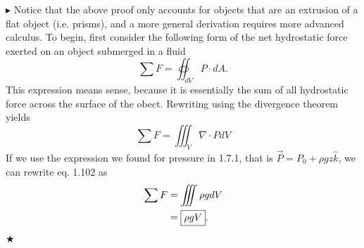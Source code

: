 \noindent\color{Orchid}$\blacktriangleright$ \color{black} Notice that the above proof only accounts for objects that are an extrusion of a flat object (i.e. prisms), and a more general derivation requires more advanced calculus. To begin, first consider the following form of the net hydrostatic force exerted on an object submerged in a fluid
\begin{equation}
    \sum F = \oiint_{dV}P \cdot dA.
\end{equation}
\noindent This expression means sense, because it is essentially the sum of all hydrostatic force across the surface of the obect. Rewriting using the divergence theorem yields
\begin{equation}
    \sum F = \iiint_{V} \nabla \cdot PdV
\end{equation}
\noindent If we use the expression we found for pressure in 1.7.1, that is $\vec{P} = P_0 + \rho g z \hat{k}$, we can rewrite eq. 1.102 as
\begin{align}
    \sum F &= \iiint  \rho g dV \nonumber \\
    &= \boxed{\rho g V}.
\end{align}
\noindent $\bigstar$

%
%
